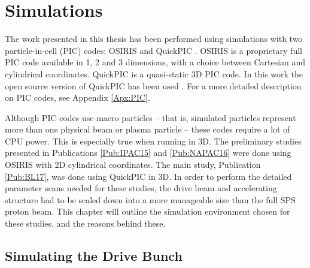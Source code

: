 %
%

\chapter{Simulations}
\label{Ch:Sim}

The work presented in this thesis has been performed using simulations with two particle-in-cell (PIC) codes:
OSIRIS \cite{fonseca:2002} and QuickPIC \cite{an:2013, huang:2006}.
OSIRIS is a proprietary full PIC code available in 1, 2 and 3 dimensions, with a choice between Cartesian and cylindrical coordinates.
QuickPIC is a quasi-static 3D PIC code. In this work the open source version of QuickPIC has been used \cite{add:quickpic:web}.
For a more detailed description on PIC codes, see Appendix \ref{Apx:PIC}.

Although PIC codes use macro particles -- that is, simulated particles represent more than one physical beam or plasma particle -- these codes require a lot of CPU power.
This is especially true when running in 3D.
The preliminary studies presented in Publications \ref{Pub:IPAC15} and \ref{Pub:NAPAC16} were done using OSIRIS with 2D cylindrical coordinates.
The main study, Publication \ref{Pub:BL17}, was done using QuickPIC in 3D.
In order to perform the detailed parameter scans needed for these studies, the drive beam and accelerating structure had to be scaled down into a more manageable size than the full SPS proton beam.
This chapter will outline the simulation environment chosen for these studies, and the reasons behind these.

\section{Simulating the Drive Bunch}
\label{Sim:PBeam}

